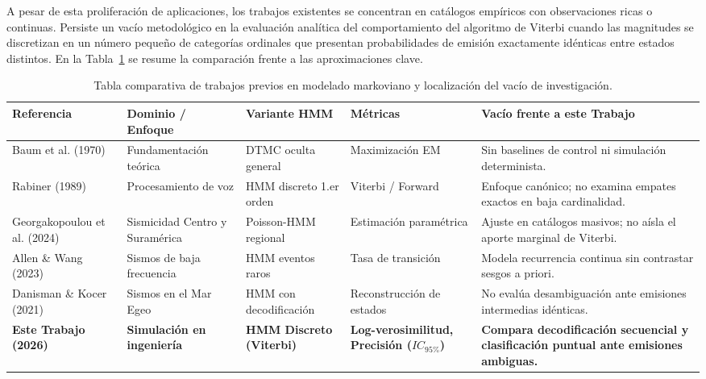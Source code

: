\documentclass[11pt,a4paper]{article}
\begin{document}
A pesar de esta proliferación de aplicaciones, los trabajos existentes se concentran en catálogos empíricos con observaciones ricas o continuas. Persiste un vacío metodológico en la evaluación analítica del comportamiento del algoritmo de Viterbi cuando las magnitudes se discretizan en un número pequeño de categorías ordinales que presentan probabilidades de emisión exactamente idénticas entre estados distintos. En la Tabla~\ref{tab:estado_arte} se resume la comparación frente a las aproximaciones clave.

\begin{table}[htbp]
\centering
\small
\caption{Tabla comparativa de trabajos previos en modelado markoviano y localización del vacío de investigación.}
\label{tab:estado_arte}
\begin{tabular}{p{3.2cm}p{3.2cm}p{2.6cm}p{2.6cm}p{3.4cm}}
\toprule
\textbf{Referencia} & \textbf{Dominio / Enfoque} & \textbf{Variante HMM} & \textbf{Métricas} & \textbf{Vacío frente a este Trabajo} \\
\midrule
Baum et al. (1970)~\cite{baum1970maximization} & Fundamentación teórica & DTMC oculta general & Maximización EM & Sin baselines de control ni simulación determinista. \\
Rabiner (1989)~\cite{rabiner1989tutorial} & Procesamiento de voz & HMM discreto 1.er orden & Viterbi / Forward & Enfoque canónico; no examina empates exactos en baja cardinalidad. \\
Georgakopoulou et al. (2024)~\cite{georgakopoulou2024seismic} & Sismicidad Centro y Suramérica & Poisson-HMM regional & Estimación paramétrica & Ajuste en catálogos masivos; no aísla el aporte marginal de Viterbi. \\
Allen \& Wang (2023)~\cite{allen2023hidden} & Sismos de baja frecuencia & HMM eventos raros & Tasa de transición & Modela recurrencia continua sin contrastar sesgos a priori. \\
Danisman \& Kocer (2021)~\cite{danisman2021fitting} & Sismos en el Mar Egeo & HMM con decodificación & Reconstrucción de estados & No evalúa desambiguación ante emisiones intermedias idénticas. \\
\textbf{Este Trabajo (2026)} & \textbf{Simulación en ingeniería} & \textbf{HMM Discreto (Viterbi)} & \textbf{Log-verosimilitud, Precisión ($IC_{95\%}$)} & \textbf{Compara decodificación secuencial y clasificación puntual ante emisiones ambiguas.} \\
\bottomrule
\end{tabular}
\end{table}
\end{document}
